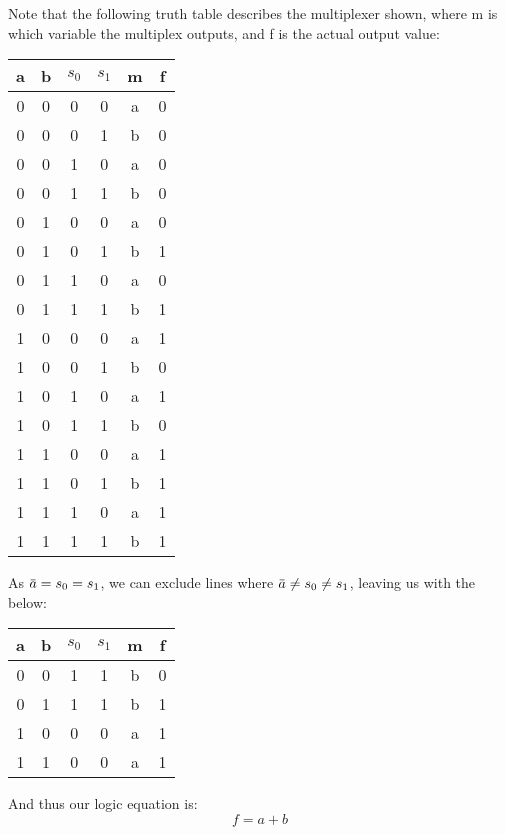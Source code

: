 \documentclass[12pt]{article}
\newcommand{\overbar}[1]{\mkern 1.5mu\overline{\mkern-1.5mu#1\mkern-1.5mu}\mkern 1.5mu}
\begin{document}
\begin{enumerate}
	      Note that the following truth table describes the multiplexer shown, where m is which variable the multiplex outputs, and f is the actual output value:
	      \begin{center}
	      	\begin{tabular}{|c c|c c|c|c|}
	      		\hline
	      		a & b & $s_0$ & $s_1$ & m & f \\
	      		\hline
	      		0 & 0 & 0     & 0     & a & 0 \\
	      		0 & 0 & 0     & 1     & b & 0 \\
	      		0 & 0 & 1     & 0     & a & 0 \\
	      		0 & 0 & 1     & 1     & b & 0 \\
	      		0 & 1 & 0     & 0     & a & 0 \\
	      		0 & 1 & 0     & 1     & b & 1 \\
	      		0 & 1 & 1     & 0     & a & 0 \\
	      		0 & 1 & 1     & 1     & b & 1 \\
	      		1 & 0 & 0     & 0     & a & 1 \\
	      		1 & 0 & 0     & 1     & b & 0 \\
	      		1 & 0 & 1     & 0     & a & 1 \\
	      		1 & 0 & 1     & 1     & b & 0 \\
	      		1 & 1 & 0     & 0     & a & 1 \\
	      		1 & 1 & 0     & 1     & b & 1 \\
	      		1 & 1 & 1     & 0     & a & 1 \\
	      		1 & 1 & 1     & 1     & b & 1 \\
	      		\hline
	      	\end{tabular}
	      \end{center}
	      As $\overbar{a} = s_0 = s_1$, we can exclude lines where $\overbar{a} \neq s_0 \neq s_1$, leaving us with the below:
	      \begin{center}
	      	\begin{tabular}{|c c|c c|c|c|}
	      		\hline
	      		a & b & $s_0$ & $s_1$ & m & f \\
	      		\hline
	      		0 & 0 & 1     & 1     & b & 0 \\
	      		0 & 1 & 1     & 1     & b & 1 \\
	      		1 & 0 & 0     & 0     & a & 1 \\
	      		1 & 1 & 0     & 0     & a & 1 \\
	      		\hline
	      	\end{tabular}
	      \end{center}
	      And thus our logic equation is:
	      \[
	      	\boxed{f = a+b}
	      \]

\end{enumerate}
\end{document}
